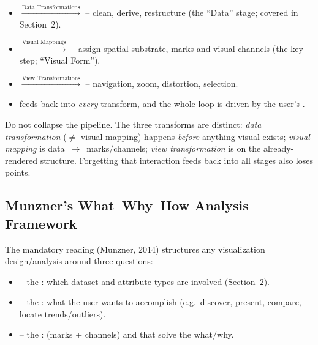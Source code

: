 \begin{itemize}
  \item {} $\xrightarrow{\text{Data Transformations}}$  -- clean, derive, restructure (the ``Data'' stage; covered in Section~2).
  \item {} $\xrightarrow{\text{Visual Mappings}}$  -- assign spatial substrate, marks and visual channels (the key step; ``Visual Form'').
  \item {} $\xrightarrow{\text{View Transformations}}$  -- navigation, zoom, distortion, selection.
  \item {} feeds back into \emph{every} transform, and the whole loop is driven by the user's .
\end{itemize}

\begin{pitfall}
Do not collapse the pipeline. The three transforms are distinct: \emph{data transformation} ($\neq$ visual mapping) happens \emph{before} anything visual exists; \emph{visual mapping} is data~$\rightarrow$~marks/channels; \emph{view transformation} is on the already-rendered structure. Forgetting that interaction feeds back into all stages also loses points.
\end{pitfall}

\subsection{Munzner's What--Why--How Analysis Framework}

The mandatory reading (Munzner, 2014) structures any visualization design/analysis around three  questions:

\begin{keybox}
\begin{itemize}
  \item {} -- the : which dataset and attribute types are involved (Section~2).
  \item {} -- the : what the user wants to accomplish (e.g.\ discover, present, compare, locate trends/outliers).
  \item {} -- the :  (marks + channels) and  that solve the what/why.
\end{itemize}
\end{keybox}


